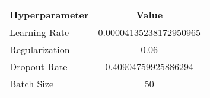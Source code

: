 \begin{tabular}{lc}
	\toprule
    \textbf{Hyperparameter} & \textbf{Value} \\
    \midrule
    Learning Rate & 0.00004135238172950965 \\ 
    \midrule
    Regularization & 0.06 \\ 
    \midrule
    Dropout Rate & 0.40904759925886294\\
    \midrule
    Batch Size & 50 \\
    \bottomrule
\end{tabular}
